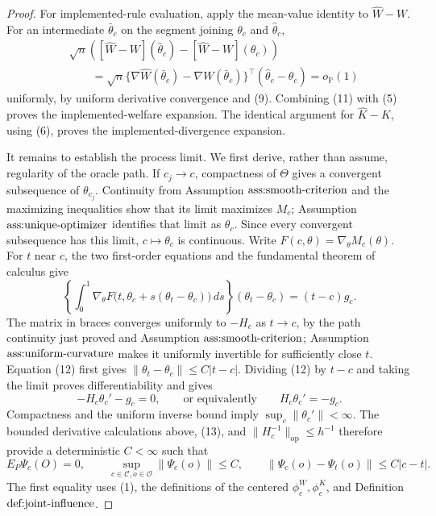 \documentclass{article}
\begin{document}
\begin{proof}
For implemented-rule evaluation, apply the mean-value identity to \(\widehat W-W\).  For an intermediate \(\bar\theta_c\) on the segment joining \(\theta_c\) and \(\widehat\theta_c\),
\[
\begin{aligned}
 &\sqrt n\left(
 [\widehat W-W](\widehat\theta_c)-[\widehat W-W](\theta_c)
 \right)\\
 &\qquad=\sqrt n\{\nabla\widehat W(\bar\theta_c)-\nabla W(\bar\theta_c)\}^\top
 (\widehat\theta_c-\theta_c)=o_{\mathbb P}(1)
\end{aligned} \tag{11}
\]
uniformly, by uniform derivative convergence and (9).  Combining (11) with (5) proves the implemented-welfare expansion.  The identical argument for \(\widehat K-K\), using (6), proves the implemented-divergence expansion.

It remains to establish the process limit.  We first derive, rather than assume, regularity of the oracle path.  If \(c_j\to c\), compactness of \(\Theta\) gives a convergent subsequence of \(\theta_{c_j}\).  Continuity from Assumption \(\textnormal{ass:smooth-criterion}\) and the maximizing inequalities show that its limit maximizes \(M_c\); Assumption \(\textnormal{ass:unique-optimizer}\) identifies that limit as \(\theta_c\).  Since every convergent subsequence has this limit, \(c\mapsto\theta_c\) is continuous.  Write \(F(c,\theta)=\nabla_\theta M_c(\theta)\).  For \(t\) near \(c\), the two first-order equations and the fundamental theorem of calculus give
\[
 \left\{\int_0^1\nabla_\theta F\bigl(t,\theta_c+s(\theta_t-\theta_c)\bigr)\,ds\right\}
 (\theta_t-\theta_c)=(t-c)g_c. \tag{12}
\]
The matrix in braces converges uniformly to \(-H_c\) as \(t\to c\), by the path continuity just proved and Assumption \(\textnormal{ass:smooth-criterion}\); Assumption \(\textnormal{ass:uniform-curvature}\) makes it uniformly invertible for sufficiently close \(t\).  Equation (12) first gives \(\|\theta_t-\theta_c\|\le C|t-c|\).  Dividing (12) by \(t-c\) and taking the limit proves differentiability and gives
\[
 -H_c\theta_c'-g_c=0,
 \qquad\text{or equivalently}\qquad H_c\theta_c'=-g_c. \tag{13}
\]
Compactness and the uniform inverse bound imply \(\sup_c\|\theta_c'\|<\infty\).  The bounded derivative calculations above, (13), and \(\|H_c^{-1}\|_{\mathrm{op}}\le h^{-1}\) therefore provide a deterministic \(C<\infty\) such that
\[
 E_P\Psi_c(O)=0,
 \qquad \sup_{c\in\mathcal C,o\in\mathcal O}\|\Psi_c(o)\|\le C,
 \qquad \|\Psi_c(o)-\Psi_t(o)\|\le C|c-t|. \tag{14}
\]
The first equality uses (1), the definitions of the centered \(\phi_c^W,\phi_c^K\), and Definition \(\textnormal{def:joint-influence}\).


\end{proof}
\end{document}
